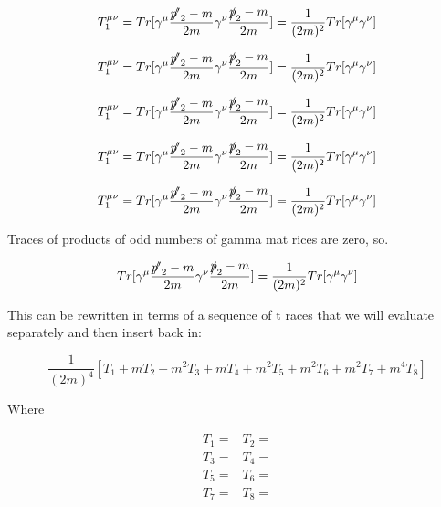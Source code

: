 \documentclass[a4]{article}
\begin{document}
    \begin{equation}
        T_1^{\mu \nu} = Tr [\gamma^\mu \frac{\slashed{p'}_2 - m}{2m} \gamma^\nu \frac{\slashed{p}_2 - m}{2 m}] = \frac{1}{(2m)^2} Tr[\gamma^\mu \gamma^\nu]
    \end{equation}

    \begin{equation}
        T_1^{\mu \nu} = Tr [\gamma^\mu \frac{\slashed{p'}_2 - m}{2m} \gamma^\nu \frac{\slashed{p}_2 - m}{2 m}] = \frac{1}{(2m)^2} Tr[\gamma^\mu \gamma^\nu]
    \end{equation}

    \begin{equation}
        T_1^{\mu \nu} = Tr [\gamma^\mu \frac{\slashed{p'}_2 - m}{2m} \gamma^\nu \frac{\slashed{p}_2 - m}{2 m}] = \frac{1}{(2m)^2} Tr[\gamma^\mu \gamma^\nu]
    \end{equation}

    \begin{equation}
        T_1^{\mu \nu} = Tr [\gamma^\mu \frac{\slashed{p'}_2 - m}{2m} \gamma^\nu \frac{\slashed{p}_2 - m}{2 m}] = \frac{1}{(2m)^2} Tr[\gamma^\mu \gamma^\nu]
    \end{equation}

    \begin{equation}
        T_1^{\mu \nu} = Tr [\gamma^\mu \frac{\slashed{p'}_2 - m}{2m} \gamma^\nu \frac{\slashed{p}_2 - m}{2 m}] = \frac{1}{(2m)^2} Tr[\gamma^\mu \gamma^\nu]
    \end{equation}

    Traces of products of odd numbers of gamma mat rices are zero, so.

    \begin{equation}
        Tr [\gamma^\mu \frac{\slashed{p'}_2 - m}{2m} \gamma^\nu \frac{\slashed{p}_2 - m}{2 m}] = \frac{1}{(2m)^2} Tr[\gamma^\mu \gamma^\nu]
    \end{equation}

    This can be rewritten in terms of a sequence of t races that we will evaluate separately and then insert back in:

    \begin{equation}
        \frac{1}{(2 m)^4} [T_1 + m T_2 + m^2 T_3 + m T_4 + m^2 T_5 + m^2 T_6 + m^2 T_7 + m^4 T_8]
    \end{equation}

    Where

    \begin{eqnarray}
        T_1 = & T_2 = \\
        T_3 = & T_4 = \\
        T_5 = & T_6 = \\
        T_7 = & T_8 = \\
    \end{eqnarray}
\end{document}
